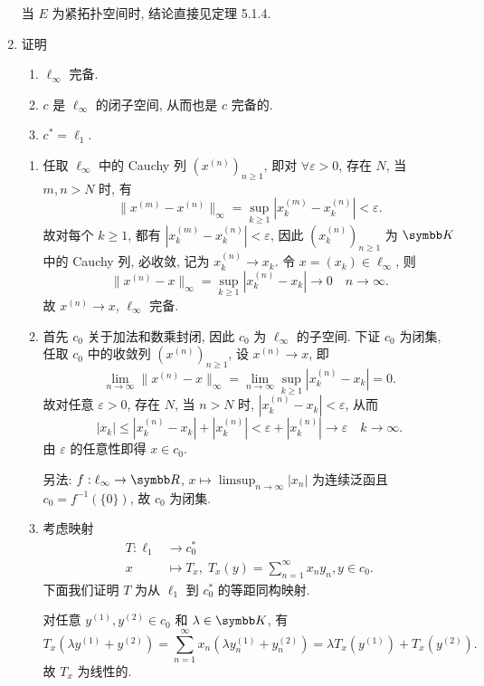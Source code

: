 \begin{enumerate}
\begin{answer}
      当 $E$ 为紧拓扑空间时, 结论直接见定理 5.1.4.
    \end{answer}
  \item 证明
    \begin{enumerate}
      \item $\ell_{\infty}$ 完备.
      \item $c$ 是 $\ell_{\infty}$ 的闭子空间, 从而也是 $c$ 完备的.
      \item $c^{*}=\ell_{1}$.
    \end{enumerate}
    \begin{answer}
      \begin{enumerate}
        \item 任取 $\ell_{\infty}$ 中的 Cauchy 列 $(x^{(n)})_{n\geq 1}$,
        即对 $\forall\varepsilon>0$, 存在 $N$, 当 $m,n>N$ 时, 有
        \[\|x^{(m)}-x^{(n)}\|_{\infty}=\sup_{k\geq 1}|x^{(m)}_k-x^{(n)}_k|<\varepsilon.\]
        故对每个 $k\geq 1$, 都有 $|x^{(m)}_k-x^{(n)}_k|<\varepsilon$,
        因此 $(x^{(n)}_k)_{n\geq 1}$ 为 $\K$ 中的 Cauchy 列, 必收敛, 记为 $x^{(n)}_k\to x_k$.
        令 $x=(x_k)\in\ell_{\infty}$, 则
        \[\|x^{(n)}-x\|_{\infty}=\sup_{k\geq 1}|x^{(n)}_k-x_k|\to 0\quad n\to\infty.\]
        故 $x^{(n)}\to x$, $\ell_{\infty}$ 完备.
    
        \item 首先 $c_0$ 关于加法和数乘封闭, 因此 $c_0$ 为 $\ell_{\infty}$
        的子空间. 下证 $c_0$ 为闭集, 任取 $c_0$ 中的收敛列 $(x^{(n)})_{n\geq 1}$,
        设 $x^{(n)}\to x$, 即
        \[\lim_{n\to\infty}\|x^{(n)}-x\|_{\infty}=\lim_{n\to\infty}\sup_{k\geq 1}|x^{(n)}_k-x_k|=0.\]
        故对任意 $\varepsilon>0$, 存在 $N$, 当 $n>N$ 时, $|x^{(n)}_k-x_k|<\varepsilon$, 从而
        \[|x_k|\leq|x^{(n)}_k-x_k|+|x^{(n)}_k|<\varepsilon+|x^{(n)}_k|\to\varepsilon\quad k\to\infty.\]
        由 $\varepsilon$ 的任意性即得 $x\in c_0$.
    
        另法: $f:\ell_{\infty}\to\R$, $x\mapsto\limsup_{n\to\infty}|x_n|$
        为连续泛函且 $c_0=f^{-1}(\{0\})$, 故 $c_0$ 为闭集.
    
        \item 考虑映射
        \begin{align*}
            T: \ell_1 & \longrightarrow c_0^* \\
                    x & \longmapsto T_x,\;T_x(y)=\sum_{n=1}^{\infty}x_ny_n, y\in c_0.
        \end{align*}
        下面我们证明 $T$ 为从 $\ell_1$ 到 $c_0^*$ 的等距同构映射.
    
        对任意 $y^{(1)},y^{(2)}\in c_0$ 和 $\lambda\in\K$, 有
        \[T_x(\lambda y^{(1)}+y^{(2)})=\sum_{n=1}^{\infty}x_n(\lambda y^{(1)}_n+y^{(2)}_n)=\lambda T_x(y^{(1)})+T_x(y^{(2)}).\]
        故 $T_x$ 为线性的.
    

\end{enumerate}
\end{answer}
\end{enumerate}
